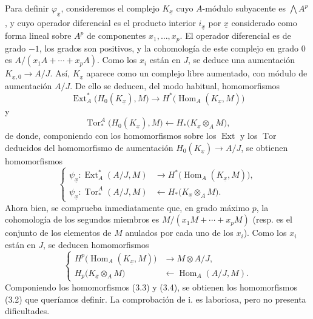 Para definir $\varphi_{\underline{x}}$, consideremos el complejo
$K_{\underline{x}}$ cuyo $A$-módulo subyacente es $\bigwedge A^{p}$, y
cuyo operador diferencial es el producto interior $i_{\underline{x}}$ por
$\underline{x}$ considerado como forma lineal sobre $A^{p}$ de componentes
$x_1,\ldots,x_p$. El operador diferencial es de grado $-1$, los grados son
positivos, y la cohomología de este complejo en grado $0$ es
$A/(x_1A+\cdots+x_pA)$. Como los $x_i$ están en $J$, se deduce una
aumentación $K_{\underline{x},0}\longrightarrow A/J$. Así,
$K_{\underline{x}}$ aparece como un complejo libre aumentado, con módulo
de aumentación $A/J$. De ello se deducen, del modo habitual, homomorfismos
\[
\operatorname{Ext}_{A}^{*}\bigl(H_0(K_{\underline{x}}),M\bigr)
\longrightarrow
H^{*}\bigl(\operatorname{Hom}_{A}(K_{\underline{x}},M)\bigr)
\]
y
\[
\operatorname{Tor}_{*}^{A}\bigl(H_0(K_{\underline{x}}),M\bigr)
\longleftarrow
H_{*}\bigl(K_{\underline{x}}\otimes_A M\bigr),
\]
de donde, componiendo con los homomorfismos sobre los $\operatorname{Ext}$ y los
$\operatorname{Tor}$ deducidos del homomorfismo de aumentación
$H_0(K_{\underline{x}})\longrightarrow A/J$, se obtienen homomorfismos
\begin{equation}\tag{3.3}
\left\{
\begin{aligned}
\psi_{\underline{x}}:
\operatorname{Ext}_{A}^{*}(A/J,M)
&\longrightarrow H^{*}\bigl(\operatorname{Hom}_{A}(K_{\underline{x}},M)\bigr),\\
\psi_{\underline{x}}:
\operatorname{Tor}_{*}^{A}(A/J,M)
&\longleftarrow H_{*}\bigl(K_{\underline{x}}\otimes_A M\bigr).
\end{aligned}
\right.
\end{equation}
Ahora bien, se comprueba inmediatamente que, en grado máximo $p$, la cohomología de los segundos
miembros es $M/(x_1M+\cdots+x_pM)$ (resp. es el conjunto de los elementos de $M$
anulados por cada uno de los $x_i$). Como los $x_i$ están en $J$, se deducen
homomorfismos
\begin{equation}\tag{3.4}
\left\{
\begin{aligned}
H^{p}\bigl(\operatorname{Hom}_{A}(K_{\underline{x}},M)\bigr)
&\longrightarrow M\otimes A/J,\\
H_{p}\bigl(K_{\underline{x}}\otimes_A M\bigr)
&\longleftarrow\operatorname{Hom}_{A}(A/J,M).
\end{aligned}
\right.
\end{equation}
Componiendo los homomorfismos (3.3) y (3.4), se obtienen los homomorfismos (3.2)
que queríamos definir. La comprobación de i. es laboriosa, pero no
presenta dificultades.

